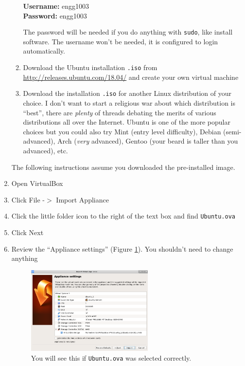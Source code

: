\documentclass{lab}
\begin{document}
\begin{enumerate}
\begin{enumerate}
\textbf{Username:} engg1003\\
\textbf{Password:} engg1003

The password will be needed if you do anything with \texttt{sudo}, like install software. The username won't be needed, it is configured to login automatically.

		\item Download the Ubuntu installation \texttt{.iso} from \url{http://releases.ubuntu.com/18.04/} and create your own virtual machine
		\item Download the installation \texttt{.iso} for another Linux distribution of your choice. I don't want to start a religious war about which distribution is ``best'', there are \textit{plenty} of threads debating the merits of various distributions all over the Internet. Ubuntu is one of the more popular choices but you could also try Mint (entry level difficulty), Debian (semi-advanced), Arch (\textit{very} advanced), Gentoo (your beard is taller than you advanced), etc.
	\end{enumerate}
	\pagebreak
	The following instructions assume you downloaded the pre-installed image.
\item Open VirtualBox
\item Click File -$>$ Import Appliance
\item Click the little folder icon to the right of the text box and find \texttt{Ubuntu.ova}
\item Click Next
\item Review the ``Appliance settings'' (Figure \ref{fig:virtualbox1}). You shouldn't need to change anything

\begin{figure}[H]
\begin{center}
\includegraphics[width=0.6\textwidth]{Wk1Images/ubuntu_import.png}
\end{center}
\caption{You will see this if \texttt{Ubuntu.ova} was selected correctly.}\label{fig:virtualbox1}
\end{figure}


\end{enumerate}
\end{document}
